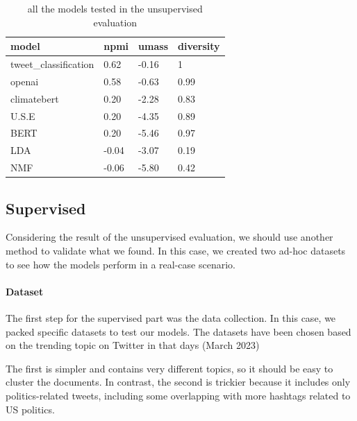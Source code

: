 \begin{table}[]
\centering
\begin{tabular}{|llll|}
\hline
\textbf{model}                              & \textbf{npmi} & \textbf{umass} & \textbf{diversity} \\ \hline
\multicolumn{1}{|l|}{tweet\_classification} & 0.62          & -0.16          & 1                  \\
\multicolumn{1}{|l|}{openai}                & 0.58          & -0.63          & 0.99               \\
\multicolumn{1}{|l|}{climatebert}           & 0.20          & -2.28          & 0.83               \\
\multicolumn{1}{|l|}{U.S.E}                 & 0.20          & -4.35          & 0.89               \\
\multicolumn{1}{|l|}{BERT}                  & 0.20          & -5.46          & 0.97               \\
\multicolumn{1}{|l|}{LDA}                   & -0.04         & -3.07          & 0.19               \\
\multicolumn{1}{|l|}{NMF}                   & -0.06         & -5.80          & 0.42               \\ \hline
\end{tabular}
\caption{all the models tested in the unsupervised evaluation}
\label{tab:unsupervised_recap}
\end{table}


\subsection{Supervised}
Considering the result of the unsupervised evaluation, we should use another method to validate what we found. In this case, we created two ad-hoc datasets to see how the models perform in a real-case scenario.

\paragraph{Dataset}

The first step for the supervised part was the data collection. In this case, we packed specific datasets to test our models. The datasets have been chosen based on the trending topic on Twitter in that days (March 2023)

The first is simpler and contains very different topics, so it should be easy to cluster the documents. In contrast, the second is trickier because it includes only politics-related tweets, including some overlapping with more hashtags related to US politics.

